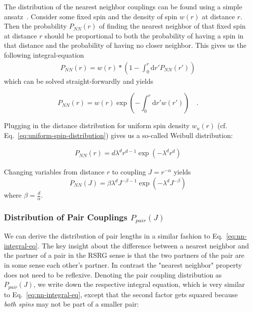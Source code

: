The distribution of the nearest neighbor couplings can be found using a simple ansatz~\cite{chandrasekharStochasticProblemsPhysics1943}. Consider some fixed spin and the density of spin $w(r)$ at distance $r$. Then the probability $P_{NN}(r)$ of finding the nearest neighbor of that fixed spin at distance $r$ should be proportional to both the probability of having a spin in that distance and the probability of having no closer neighbor. This gives us the following integral-equation 
\begin{align}\label{eq:nn-integral-eq}
	P_{NN}(r) = w(r)*\left(1-\int_0^r \mathrm{d}r' P_{NN}(r')\right)
\end{align}
which can be solved straight-forwardly and yields

\begin{equation}\label{eq:nn-distribution}
	P_{NN}(r) = w(r)\exp\left(-\int_0^r \!\mathrm{d}r' w(r')\right)\quad.
\end{equation}

Plugging in the distance distribution for uniform spin density $w_u(r)$ (cf. Eq.~\ref{eq:uniform-spin-distribution}) gives us a so-called Weibull distribution:

\begin{align}\label{eq:weibull-distribution}
	P_{NN}(r) = d \lambda^d r^{d-1} \exp(- \lambda^d r^d)
\end{align}


Changing variables from distance $r$ to coupling $J=r^{-\alpha}$ yields
%
%
%
\begin{equation}
	P_{NN}(J) = \beta\lambda^d J^{-\beta-1} \exp\left(-\lambda^d J^{-\beta}\right)
\end{equation}
where $\beta=\frac{d}{\alpha}$.

\subsubsection{Distribution of Pair Couplings $P_{pair}(J)$}
We can derive the distribution of pair lengths in a similar fashion to Eq.~\ref{eq:nn-integral-eq}. The key insight about the difference between a nearest neighbor and the partner of a pair in the RSRG sense is that the two partners of the pair are in some sense each other's partner. In contrast the "nearest neighbor" property does not need to be reflexive. Denoting the pair coupling distribution as $P_{pair}(J)$, we write down the respective integral equation, which is very similar to Eq.~\ref{eq:nn-integral-eq}, except that the second factor gets squared because \emph{both spins} may not be part of a smaller pair:

